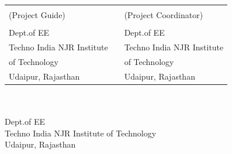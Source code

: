 	
	\begin{singlespace}
		\vspace*{2cm}
		\begin{table}[h!]
			\centering
			\begin{tabular}{p{7cm} p{1.5cm} p{7cm}} 
				\textbf{\guide} && \textbf{\semcordinatorA} \\
				(Project Guide) &&  (Project Coordinator)\\
				\guidedes & & \semcordinatorAdes\\ 
				Dept.of EE && Dept.of EE\\ 
				Techno India NJR Institute & &Techno India NJR Institute\\
				of Technology &&of Technology\\
				Udaipur, Rajasthan && Udaipur, Rajasthan\\
			\end{tabular}
			
		\end{table}
		
		\vspace*{1.3cm}
		
		\begin{center}
			
			\textbf{\hod} \\ 
			\hoddes\\ 
			Dept.of EE\\ 
			Techno India NJR Institute of Technology\\
			Udaipur, Rajasthan\\
			
		\end{center}
	\end{singlespace}
	
	\thispagestyle{empty}



